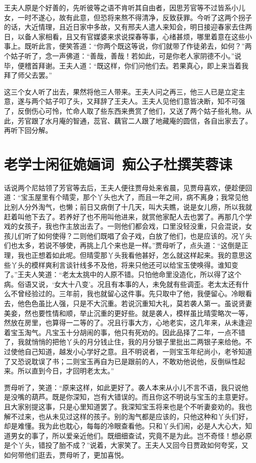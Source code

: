 \documentclass[12pt,oneside]{book}
\begin{document}
王夫人原是个好善的，先听彼等之语不肯听其自由者，因思芳官等不过皆系小儿女，一时不遂心，故有此意，但恐将来熬不得清净，反致获罪。今听了这两个拐子的话，大近情理，且近日家中多故，又有邢夫人遣人来知会，明日接迎春家去住两日，以备人家相看，且又有官媒婆来求说探春等事，心绪甚烦，哪里着意在这些小事上。既听此言，便笑答道：“你两个既这等说，你们就带了作徒弟去，如何？”两个姑子听了，念一声佛道：“善哉，善哉！若如此，可是你老人家阴德不小。”说毕，便稽首拜谢。王夫人道：“既这样，你们问他们去。若果真心，即上来当着我拜了师父去罢。”

这三个女人听了出去，果然将他三人带来。王夫人问之再三，他三人已是立定主意，遂与两个姑子叩了头，又拜辞了王夫人。王夫人见他们意皆决断，知不可强了，反倒伤心可怜，忙命人取了些东西来赉赏了他们，又送了两个姑子些礼物。从此，芳官跟了水月庵的智通，蕊官、藕官二人跟了地藏庵的圆信，各自出家去了。再听下回分解。


 
\chapter{老学士闲征姽婳词~痴公子杜撰芙蓉诔}
话说两个尼姑领了芳官等去后，王夫人便往贾母处来省晨，见贾母喜欢，便趁便回道：“宝玉屋里有个晴雯，那个丫头也大了，而且一年之间，病不离身；我常见他比别人分外淘气，也懒；前日又病倒了十几天，叫大夫瞧，说是女儿痨，所以我就赶着叫他下去了。若养好了也不用叫他进来，就赏他家配人去也罢了。再那几个学戏的女孩子，我也作主放出去了。一则他们都会戏，口里没轻没重，只会混说，女孩儿们听了如何使得？二则他们既唱了会子戏，白放了他们，也是应该的。况丫头们也太多，若说不够使，再挑上几个来也是一样。”贾母听了，点头道：“这倒是正理，我也正想着如此呢。但晴雯那丫头我看他甚好，怎么就这样起来。我的意思这些丫头的模样爽利言谈针线多不及他，将来只他还可以给宝玉使唤得。谁知变了。”王夫人笑道：“老太太挑中的人原不错。只怕他命里没造化，所以得了这个病。俗语又说，‘女大十八变’。况且有本事的人，未免就有些调歪。老太太还有什么不曾经验过的。三年前，我也就留心这件事。先只取中了他，我便留心。冷眼看去，他色色虽比人强，只是不大沉重。若说沉重知大礼，莫若袭人第一。虽说贤妻美妾，然也要性情和顺，举止沉重的更好些。就是袭人，模样虽比晴雯略次一等，然放在房里，也算得一二等的了。况且行事大方，心地老实，这几年来，从未逢迎着宝玉淘气。凡宝玉十分胡闹的事，他只有死劝的。因此品择了二年，一点不错了，我就悄悄的把他丫头的月分钱止住，我的月分银子里批出二两银子来给他。不过使他自己知道，越发小心学好之意。且不明说者，一则宝玉年纪尚小，老爷知道了又恐说耽误了书；二则宝玉再自为已是跟前的人，不敢劝他说他，反倒纵性起来。所以直到今日，才回明老太太。”

贾母听了，笑道：“原来这样，如此更好了。袭人本来从小儿不言不语，我只说他是没嘴的葫芦。既是你深知，岂有大错误的。而且你这不明说与宝玉的主意更好。且大家别提这事，只是心里知道罢了。我深知宝玉将来也是个不听妻妾劝的。我也解不过来，也从未见过这样的孩子。别的淘气都是应该的，只他这种和丫头们好，却是难懂。我为此也耽心，每每的冷眼查看他。只和丫头们闹，必是人大心大，知道男女的事了，所以爱亲近他们。既细细查试，究竟不是为此。岂不奇怪！想必原是个丫头，错投了胎不成？”说着，大家笑了。王夫人又回今日贾政如何夸奖，又如何带他们逛去，贾母听了，更加喜悦。
\end{document}
